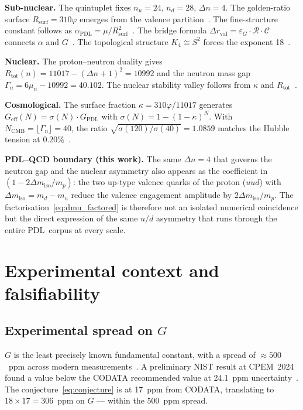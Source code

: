 \documentclass[11pt,a4paper]{article}
\theoremstyle{definition}
\newcommand{\PDL}{\textnormal{PDL}}
\newcommand{\Rsurf}{R_{\mathrm{surf}}}
\newcommand{\Rtot}{R_{\mathrm{tot}}}
\newcommand{\epsg}{\varepsilon_G}
\newcommand{\Kfour}{K_4}
\newcommand{\calR}{\mathcal{R}}
\newcommand{\calC}{\mathcal{C}}
\newcommand{\vp}{\varphi}
\newcommand{\Geff}{G_{\mathrm{eff}}}
\newcommand{\GPDL}{G_{\mathrm{PDL}}}
\newcommand{\kap}{\kappa}
\newcommand{\sig}{\sigma}
\newcommand{\drval}{\Delta r_{\mathrm{val}}}
\newcommand{\dmiso}{\Delta m_{\mathrm{iso}}}
\begin{document}
\textbf{Sub-nuclear.} The quintuplet fixes $n_u = 24$, $n_d = 28$, $\Delta n = 4$. The golden-ratio surface $\Rsurf = 310\vp$ emerges from the valence partition~\cite{Golden_Ratio_PDL_2026}. The fine-structure constant follows as $\alpha_{\mathrm{PDL}} = \mu/\Rsurf^2$~\cite{Alpha_PDL_v2_2026}. The bridge formula $\drval = \epsg\cdot\calR\cdot\calC$ connects $\alpha$ and $G$~\cite{Bridge_PDL_2026}. The topological structure $\Kfour \cong S^2$ forces the exponent 18~\cite{Topology_18_PDL_2026}.

\textbf{Nuclear.} The proton--neutron duality gives $\Rtot(n) = 11017 - (\Delta n+1)^2 = 10992$ and the neutron mass gap $\Gamma_n = 6\mu_n - 10992 = 40.102$. The nuclear stability valley follows from $\kap$ and $\Rtot$~\cite{Nuclear_Stability_PDL_2026}.

\textbf{Cosmological.} The surface fraction $\kap = 310\vp/11017$ generates $\Geff(N) = \sig(N)\cdot\GPDL$ with $\sig(N) = 1-(1-\kap)^N$. With $N_{\mathrm{CMB}} = \lfloor\Gamma_n\rfloor = 40$, the ratio $\sqrt{\sig(120)/\sig(40)} = 1.0859$ matches the Hubble tension at $0.20\%$~\cite{NCMB_PDL_2026}.

\textbf{PDL--QCD boundary (this work).} The same $\Delta n = 4$ that governs the neutron gap and the nuclear asymmetry also appears as the coefficient in $(1-2\dmiso/m_p)$: the two up-type valence quarks of the proton ($uud$) with $\dmiso = m_d - m_u$ reduce the valence engagement amplitude by $2\dmiso/m_p$. The factorisation~\eqref{eq:dmu_factored} is therefore not an isolated numerical coincidence but the direct expression of the same $u/d$ asymmetry that runs through the entire \PDL\ corpus at every scale.

\section{Experimental context and falsifiability}
\label{sec:experimental}

\subsection{Experimental spread on \texorpdfstring{$G$}{G}}

$G$ is the least precisely known fundamental constant, with a spread of $\approx500$~ppm across modern measurements~\cite{Quinn_2013,Rosi_2014,Li_2018,CODATA_2022}. A preliminary NIST result at CPEM~2024 found a value below the CODATA recommended value at 24.1~ppm uncertainty~\cite{NIST_2024}. The conjecture~\eqref{eq:conjecture} is at 17~ppm from CODATA, translating to $18\times17 = 306$~ppm on $G$ --- within the 500~ppm spread.
\end{document}
